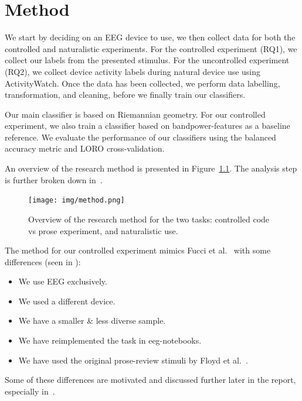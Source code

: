 \chapter{Method}

We start by deciding on an EEG device to use, we then collect data for both the controlled and naturalistic experiments. For the controlled experiment (RQ1), we collect our labels from the presented stimulus. For the uncontrolled experiment (RQ2), we collect device activity labels during natural device use using ActivityWatch. Once the data has been collected, we perform data labelling, transformation, and cleaning, before we finally train our classifiers.

Our main classifier is based on Riemannian geometry. For our controlled experiment, we also train a classifier based on bandpower-features as a baseline reference. We evaluate the performance of our classifiers using the balanced accuracy metric and LORO cross-validation.

An overview of the research method is presented in Figure~\ref{fig:method}. The analysis step is further broken down in~.

\begin{figure}[h]
    \centering
    \texttt{[image: img/method.png]}
    \caption{Overview of the research method for the two tasks: controlled code vs prose experiment, and naturalistic use.}\label{fig:method}
\end{figure}

\begin{minipage}{\textwidth}
The method for our controlled experiment mimics Fucci et al.~\cite{fucci_replication_2019} with some differences (seen in ): 

\begin{itemize}
        \item We use EEG exclusively.
        \item We used a different device.
        \item We have a smaller \& less diverse sample.
        \item We have reimplemented the task in eeg-notebooks.
        \item We have used the original prose-review stimuli by Floyd et al.~\cite{floyd_decoding_2017}.
\end{itemize}

    Some of these differences are motivated and discussed further later in the report, especially in~.
\end{minipage}

